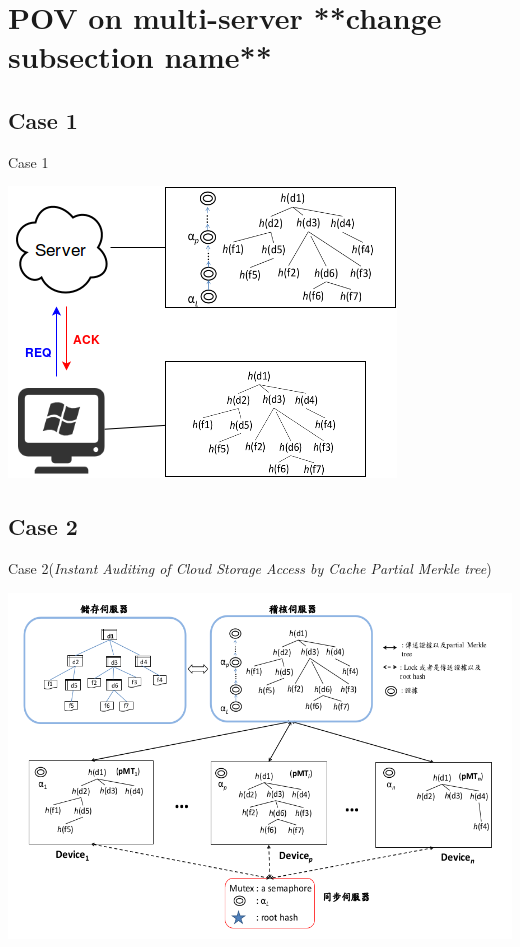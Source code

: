\documentclass{beamer}
\begin{document}
\section{POV on multi-server **change subsection name**}
\subsection{Case 1}
\begin{frame}{Case 1}
	\begin{center}
	\includegraphics[width=.7\textwidth]{Case1.png}
	\end{center}
\end{frame}

\subsection{Case 2}
\begin{frame}{Case 2}{(\textit{Instant Auditing of Cloud Storage Access by Cache Partial Merkle tree})}
	\begin{center}
	\includegraphics[width=.9\textwidth]{Case2.png}
	\end{center}
\end{frame}
\end{document}
